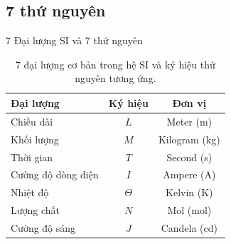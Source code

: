 \subsection{7 thứ nguyên}
\begin{frame}{7 Đại lượng SI và 7 thứ nguyên}
    \begin{table}
        \centering
        \begin{tabular}{|l|c|c|}
            \hline
            Đại lượng & Ký hiệu & Đơn vị \\
            \hline
            Chiều dài & \(L\) & Meter (m) \\
            \hline
            Khối lượng & \(M\) & Kilogram (kg) \\
            \hline
            Thời gian & \(T\) & Second (s) \\
            \hline
            Cường độ dòng điện & \(I\) & Ampere (A) \\
            \hline
            Nhiệt độ & \(\Theta\) & Kelvin (K) \\
            \hline
            Lượng chất & \(N\) & Mol (mol) \\
            \hline
            Cường độ sáng & \(J\) & Candela (cd) \\
            \hline
        \end{tabular}
        \caption{7 đại lượng cơ bản trong hệ SI và ký hiệu thứ nguyên tương ứng.}
    \end{table}
\end{frame}

